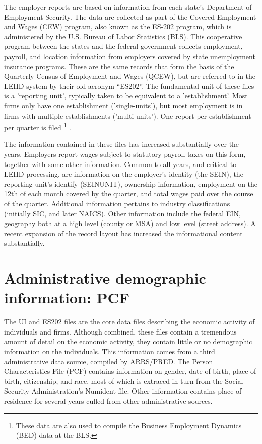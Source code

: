 The employer reports are  based on information from each state's
Department of Employment Security. The data are collected as part of the
Covered Employment and Wages (CEW) program, also known as the
ES-202 program, which is administered by the U.S. Bureau of Labor
Statistics (BLS). This cooperative program between the states and the federal
government collects employment, payroll, and location information from
employers covered by state unemployment insurance programs.
%
These are the same records that form the basis of the Quarterly
Census of Employment and Wages (QCEW), but are referred to in the LEHD
system by their old acronym ``ES202''.  The fundamental unit of these files
is a 'reporting unit', typically taken to be equivalent to a
'establishment'. Most firms only have one establishment ('single-units'),
but most employment is in firms with multiple establishments
('multi-units'). One report per establishment per quarter is filed%
%
\footnote{These data are also used to compile the  Business Employment
Dynamics (BED) data at the BLS.}%
%
.


The information contained in these files has increased substantially over
the years. Employers report wages subject to statutory payroll
taxes on this form, together with some other information. Common to all years, and critical to LEHD processing, are
information on the employer's identity (the SEIN), the reporting unit's
identify (SEINUNIT), ownership information, employment on the 12th of each month covered by the
quarter, and total wages paid over the course of the quarter. Additional
information pertains to industry classifications (initially SIC, and later
NAICS). Other information include the federal EIN, geography both at a high
level (county or MSA) and low level (street address). A recent expansion of
the record layout has increased the informational content substantially.


\section{Administrative demographic information: PCF}
\label{sec:input_files:pcf}

The UI and ES202 files are the core data files describing the economic
activity of individuals and firms. Although combined, these files contain a
tremendous amount of detail on the economic activity, they contain little
or no demographic information on the individuals. This information comes
from a third administrative data source, compiled by ARRS/PRED.
The Person Characteristics File (PCF) 
contains information on gender, date of birth, place of birth,
citizenship, and race, most of which is extraced in turn from the Social
Security Administration's Numident file. Other information contains place
of residence for several years culled from other administrative sources.

